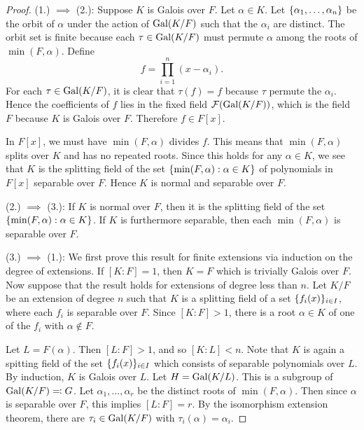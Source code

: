 \begin{proof}
	(1.) $\implies$ (2.): Suppose $K$ is Galois over $F$. Let $\alpha \in K$. Let $\lbrace\alpha_1, \dotsc, \alpha_n\rbrace$ be the orbit of $\alpha$ under the action of $\operatorname{Gal}(K/F)$ such that the $\alpha_i$ are distinct. The orbit set is finite because each $\tau \in \operatorname{Gal}(K/F)$ must permute $\alpha$ among the roots of $\min(F, \alpha)$. Define
	\begin{equation*}
		f = \prod_{i = 1}^n (x - \alpha_i).
	\end{equation*}
	For each $\tau \in \operatorname{Gal}(K/F)$, it is clear that $\tau(f) = f$ because $\tau$ permute the $\alpha_i$. Hence the coefficients of $f$ lies in the fixed field $\mathcal{F}(\operatorname{Gal}(K/F))$, which is the field $F$ because $K$ is Galois over $F$. Therefore $f \in F[x]$.
	
	In $F[x]$, we must have $\min(F, \alpha)$ divides $f$. This means that $\min(F, \alpha)$ splits over $K$ and has no repeated roots. Since this holds for any $\alpha \in K$, we see that $K$ is the splitting field of the set $\lbrace\min(F, \alpha) : \alpha \in K\rbrace$ of polynomials in $F[x]$ separable over $F$. Hence $K$ is normal and separable over $F$.
	
	(2.) $\implies$ (3.): If $K$ is normal over $F$, then it is the splitting field of the set 
	$\lbrace\min(F, \alpha) : \alpha \in K\rbrace$. If $K$ is furthermore separable, then each $\min(F, \alpha)$ is separable over $F$.
	
	(3.) $\implies$ (1.): We first prove this result for finite extensions via induction on the degree of extensions. If $[K : F] = 1$, then $K = F$ which is trivially Galois over $F$. Now suppose that the result holds for extensions of degree less than $n$. Let $K/F$ be an extension of degree $n$ such that $K$ is a splitting field of a set $\lbrace f_i(x)\rbrace_{ i \in I}$, where each $f_i$ is separable over $F$. Since $[K : F] > 1$, there is a root $\alpha \in K$ of one of the $f_i$ with $\alpha \notin F$.
	
	Let $L = F(\alpha)$. Then $[L : F] > 1$, and so $[K : L] < n$. Note that $K$ is again a spitting field of the set $\lbrace f_i(x)\rbrace_{ i \in I}$ which consists of separable polynomials over $L$. By induction, $K$ is Galois over $L$. Let $H = \operatorname{Gal}(K/L)$. This is a subgroup of $\operatorname{Gal}(K/F) \eqqcolon G$. Let $\alpha_1, \dotsc, \alpha_r$ be the distinct roots of $\min(F,\alpha)$. Then since $\alpha$ is separable over $F$, this implies $[L : F] = r$. By the isomorphism extension theorem, there are $\tau_i \in\operatorname{Gal}(K/F)$ with $\tau_i(\alpha) = \alpha_i$.
	

\end{proof}
